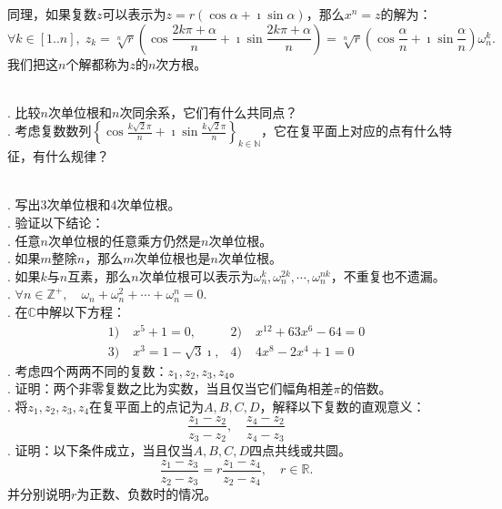 \documentclass[12pt,UTF8]{ctexbook}
\begin{document}
同理，如果复数$z$可以表示为$z = r(\cos{\alpha} + \imath \sin{\alpha})$，那么$x^n = z$的解为：
$$ \forall k\in  [1..n], \; z_k = \sqrt[n]{r}\left(\cos{\frac{2k\pi + \alpha}{n}} + \imath \sin{\frac{2k\pi + \alpha}{n}}\right) = \sqrt[n]{r}\left(\cos{\frac{\alpha}{n}} + \imath \sin{\frac{\alpha}{n}}\right)\omega_n^k. $$
我们把这$n$个解都称为$z$的$n$次方根。

\begin{sk}
    \mbox{} \\
    . 比较$n$次单位根和$n$次同余系，它们有什么共同点？\\
    . 考虑复数数列$\displaystyle\left\{\cos{\frac{k\sqrt{2}\pi}{n}} + \imath \sin{\frac{k\sqrt{2}\pi}{n}} \right\}_{k\in\mathbb{N}}$，它在复平面上对应的点有什么特征，有什么规律？
\end{sk}

\begin{xt}
    \mbox{} \\
    . 写出$3$次单位根和$4$次单位根。 \\
    . 验证以下结论：\\
    . 任意$n$次单位根的任意乘方仍然是$n$次单位根。\\
    . 如果$m$整除$n$，那么$m$次单位根也是$n$次单位根。\\
    . 如果$k$与$n$互素，那么$n$次单位根可以表示为$\omega_n^k, \omega_n^{2k}, \cdots , \omega_n^{nk}$，不重复也不遗漏。\\
    . $ \forall n\in\mathbb{Z}^+, \quad \omega_n + \omega_n^2 + \cdots + \omega_n^n = 0. $\\
    . 在$\mathbb{C}$中解以下方程：
    \begin{align*}
        1)\;& x^5 + 1 = 0,  & 2)\;& x^{12} + 63x^6 - 64 = 0 \\
        3)\;& x^3 = 1 - \sqrt{3}\imath,  & 4)\;& 4x^8 - 2x^4 + 1 = 0 
    \end{align*}
    . 考虑四个两两不同的复数：$z_1,z_2,z_3,z_4$。\\
    . 证明：两个非零复数之比为实数，当且仅当它们幅角相差$\pi$的倍数。\\
    . 将$z_1,z_2,z_3,z_4$在复平面上的点记为$A,B,C,D$，解释以下复数的直观意义：
    $$ \frac{z_1 - z_2}{z_3 - z_2}, \quad \frac{z_4 - z_2}{z_4 - z_3}  $$
    . 证明：以下条件成立，当且仅当$A,B,C,D$四点共线或共圆。
    $$ \frac{z_1 - z_3}{z_2 - z_3} = r \frac{z_1 - z_4}{z_2 - z_4}, \quad r\in \mathbb{R}. $$
    \indent 并分别说明$r$为正数、负数时的情况。

\end{xt}
\end{document}
